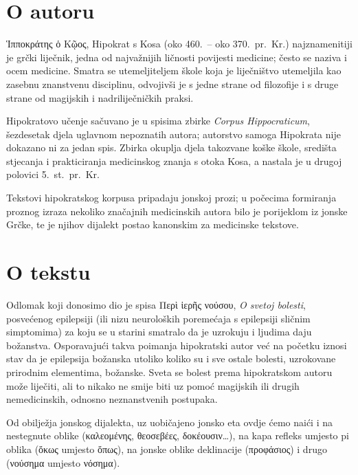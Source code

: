 \section*{O autoru}

Ἱπποκράτης ὁ Κῷος, Hipokrat s Kosa (oko 460.\ – oko 370.\ pr.~Kr.) najznamenitiji je grčki liječnik, jedna od najvažnijih ličnosti povijesti medicine; često se naziva i ocem medicine. Smatra se utemeljiteljem škole koja je liječništvo utemeljila kao zasebnu znanstvenu disciplinu, odvojivši je s jedne strane od filozofije i s druge strane od magijskih i nadriliječničkih praksi. 

Hipokratovo učenje sačuvano je u spisima zbirke \textit{Corpus Hippocraticum}, šezdesetak djela uglavnom nepoznatih autora; autorstvo samoga Hipokrata nije dokazano ni za jedan spis. Zbirka okuplja djela takozvane koške škole, središta stjecanja i prakticiranja medicinskog znanja s otoka Kosa, a nastala je u drugoj polovici 5.~st.\ pr.~Kr.

Tekstovi hipokratskog korpusa pripadaju jonskoj prozi; u počecima formiranja proznog izraza nekoliko značajnih medicinskih autora bilo je porijeklom iz jonske Grčke, te je njihov dijalekt postao kanonskim za medicinske tekstove. 

\section*{O tekstu}

Odlomak koji donosimo dio je spisa \textgreek[variant=ancient]{Περὶ ἱερῆς νούσου,} \textit{O svetoj bolesti}, posvećenog epilepsiji (ili nizu neuroloških poremećaja s epilepsiji sličnim simptomima) za koju se u starini smatralo da je uzrokuju i ljudima daju božanstva. Osporavajući takva poimanja hipokratski autor već na početku iznosi stav da je epilepsija božanska utoliko koliko su i sve ostale bolesti, uzrokovane prirodnim elementima, božanske. Sveta se bolest prema hipokratskom autoru može liječiti, ali to nikako ne smije biti uz pomoć magijskih ili drugih nemedicinskih, odnosno neznanstvenih postupaka.

Od obilježja jonskog dijalekta, uz uobičajeno jonsko eta ovdje ćemo naići i na nestegnute oblike \textgreek[variant=ancient]{(καλεομένης, θεοσεβέες, δοκέουσιν\dots),} na kapa refleks umjesto pi oblika \textgreek[variant=ancient]{(ὅκως} umjesto \textgreek[variant=ancient]{ὅπως),} na jonske oblike deklinacije \textgreek[variant=ancient]{(προφάσιος)} i drugo \textgreek[variant=ancient]{(νούσημα} umjesto \textgreek[variant=ancient]{νόσημα).}

